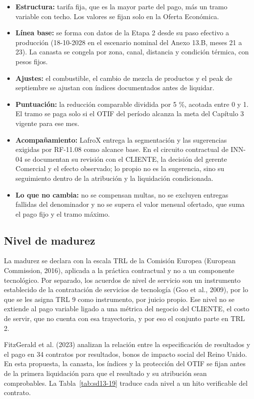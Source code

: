 \begin{itemize}
  \item \textbf{Estructura:} tarifa fija, que es la mayor parte del pago, más un tramo variable con techo. Los valores se fijan solo en la Oferta Económica.
  \item \textbf{Línea base:} se forma con datos de la Etapa 2 desde su paso efectivo a producción (18-10-2028 en el escenario nominal del Anexo 13.B, meses 21 a 23). La canasta se congela por zona, canal, distancia y condición térmica, con pesos fijos.
  \item \textbf{Ajustes:} el combustible, el cambio de mezcla de productos y el peak de septiembre se ajustan con índices documentados antes de liquidar.
  \item \textbf{Puntuación:} la reducción comparable dividida por 5 \%, acotada entre 0 y 1. El tramo se paga solo si el OTIF del período alcanza la meta del Capítulo 3 vigente para ese mes.
  \item \textbf{Acompañamiento:} LafroX entrega la segmentación y las sugerencias exigidas por RF-11.08 como alcance base. En el circuito contractual de INN-04 se documentan su revisión con el CLIENTE, la decisión del gerente Comercial y el efecto observado; lo propio no es la sugerencia, sino su seguimiento dentro de la atribución y la liquidación condicionada.
  \item \textbf{Lo que no cambia:} no se compensan multas, no se excluyen entregas fallidas del denominador y no se supera el valor mensual ofertado, que suma el pago fijo y el tramo máximo.
\end{itemize}

\subsection{Nivel de madurez}

La madurez se declara con la escala TRL de la Comisión Europea (European Commission, 2016), aplicada a la práctica contractual y no a un componente tecnológico. Por separado, los acuerdos de nivel de servicio son un instrumento establecido de la contratación de servicios de tecnología (Goo et al., 2009), por lo que se les asigna TRL 9 como instrumento, por juicio propio. Ese nivel no se extiende al pago variable ligado a una métrica del negocio del CLIENTE, el costo de servir, que no cuenta con esa trayectoria, y por eso el conjunto parte en TRL 2.

FitzGerald et al. (2023) analizan la relación entre la especificación de resultados y el pago en 34 contratos por resultados, bonos de impacto social del Reino Unido. En esta propuesta, la canasta, los índices y la protección del OTIF se fijan antes de la primera liquidación para que el resultado y su atribución sean comprobables. La Tabla~\ref{tab:sd13-19} traduce cada nivel a un hito verificable del contrato.

